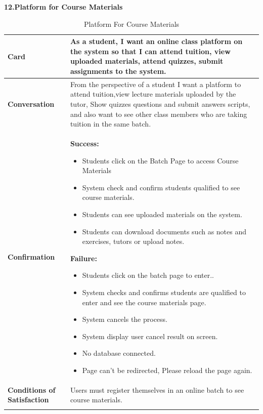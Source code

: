 \textbf{12.Platform for Course Materials}
\begin{center}
\setlength{\tabcolsep}{1.0cm}
\renewcommand{\arraystretch}{1.5}
        \centering
        \begin{longtable}{|m{70pt}|p{9cm}|}
            \hline
               \textbf{ Card} &
                    As a student, I want an online class platform on the system so that I can attend tuition, view uploaded materials, attend quizzes, submit assignments to the system.\\
            \hline
                \textbf{Conversation} &
                    From the perspective of a student I want  a platform to attend tuition,view lecture materials uploaded by the tutor, Show quizzes questions and submit answers scripts, and also want to see other class members who are taking tuition in the same batch. \\	
            \hline
                \textbf{Confirmation} &
                    \textbf{Success:}
                        \begin{itemize}
                            \item  Students click on the Batch Page to access Course Materials
                            \item  System check and confirm students qualified to see course materials.
                            \item   Students can see uploaded materials on the system.
                            \item   Students can download documents such as notes and exercises, tutors or upload notes.
                        \end{itemize}
                    \textbf{Failure:}
                        \begin{itemize}
                            \item Students click on the batch page to enter.. 
                            \item  System checks and confirms students are qualified to enter and see the course materials page.
                            \item  System cancels the process.
                            \item  System display user cancel result on screen. 
                            \item  No database connected.
                            \item  Page can't be redirected, Please reload the page again.
                        \end{itemize}\\
            \hline
               \textbf{ Conditions of Satisfaction} &
                    Users must register themselves in an online batch to see course materials. \\
            \hline
        \caption{Platform For Course Materials}
        \label{tab:my_label}
        \end{longtable}
\end{center}


